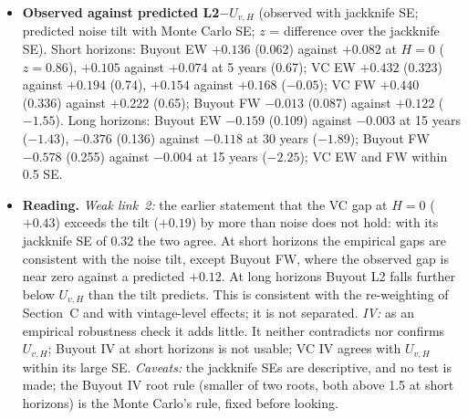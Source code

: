 \documentclass[11pt]{article}
\begin{document}
\begin{itemize}
\item \textbf{Observed against predicted L2$-U_{v,H}$} (observed with jackknife SE; predicted noise tilt with Monte Carlo SE; $z$ = difference over the jackknife SE). Short horizons: Buyout EW $+0.136$ (0.062) against $+0.082$ at $H=0$ ($z=0.86$), $+0.105$ against $+0.074$ at 5 years (0.67); VC EW $+0.432$ (0.323) against $+0.194$ (0.74), $+0.154$ against $+0.168$ ($-0.05$); VC FW $+0.440$ (0.336) against $+0.222$ (0.65); Buyout FW $-0.013$ (0.087) against $+0.122$ ($-1.55$). Long horizons: Buyout EW $-0.159$ (0.109) against $-0.003$ at 15 years ($-1.43$), $-0.376$ (0.136) against $-0.118$ at 30 years ($-1.89$); Buyout FW $-0.578$ (0.255) against $-0.004$ at 15 years ($-2.25$); VC EW and FW within 0.5 SE.
\item \textbf{Reading.} \emph{Weak link~2:} the earlier statement that the VC gap at $H=0$ ($+0.43$) exceeds the tilt ($+0.19$) by more than noise does not hold: with its jackknife SE of 0.32 the two agree. At short horizons the empirical gaps are consistent with the noise tilt, except Buyout FW, where the observed gap is near zero against a predicted $+0.12$. At long horizons Buyout L2 falls further below $U_{v,H}$ than the tilt predicts. This is consistent with the re-weighting of Section~C and with vintage-level effects; it is not separated. \emph{IV:} as an empirical robustness check it adds little. It neither contradicts nor confirms $U_{v,H}$; Buyout IV at short horizons is not usable; VC IV agrees with $U_{v,H}$ within its large SE. \emph{Caveats:} the jackknife SEs are descriptive, and no test is made; the Buyout IV root rule (smaller of two roots, both above 1.5 at short horizons) is the Monte Carlo's rule, fixed before looking.
\end{itemize}
\end{document}

